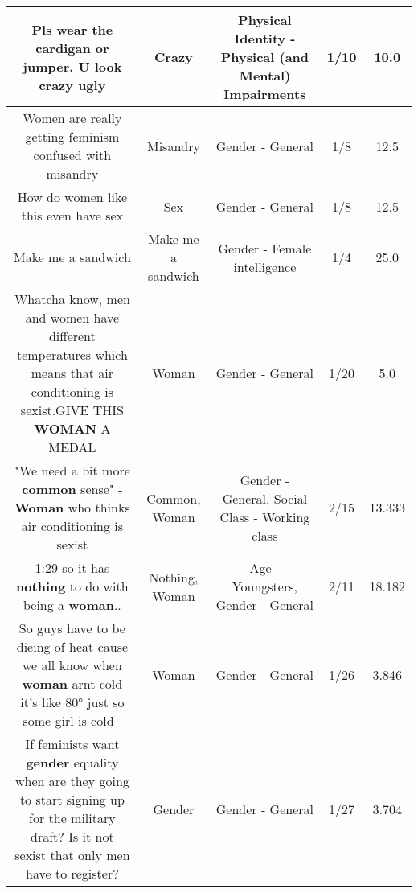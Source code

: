 \documentclass[11pt]{article}
\newlength\mylength
\begin{document}
\begin{center}
\begin{longtable}{|C{.65\mylength}|C{.30\mylength}|C{.12\mylength}|C{.12\mylength}|C{.12\mylength}|}
  \small Pls wear the cardigan or jumper. U look \textbf{crazy} ugly\normalsize   & Crazy & Physical Identity - Physical (and Mental) Impairments & 1/10 & 10.0 \\  \hline
  \small Women are really getting feminism confused with misandry\normalsize   & Misandry & Gender - General & 1/8 & 12.5 \\  \hline
  \small How do women like this even have sex\normalsize   & Sex & Gender - General & 1/8 & 12.5 \\  \hline
  \small Make me a sandwich\normalsize   & Make me a sandwich & Gender - Female intelligence & 1/4 & 25.0 \\  \hline
  \small Whatcha know, men and women have different temperatures which means that air conditioning is sexist.GIVE THIS \textbf{WOMAN} A MEDAL\normalsize   & Woman & Gender - General & 1/20 & 5.0 \\  \hline
  \small "We need a bit more \textbf{common} sense" - \textbf{Woman} who thinks air conditioning is sexist\normalsize   & Common, Woman & Gender - General, Social Class - Working class & 2/15 & 13.333 \\  \hline
  \small 1:29 so it has \textbf{nothing} to do with being a \textbf{woman}..\normalsize   & Nothing, Woman & Age - Youngsters, Gender - General & 2/11 & 18.182 \\  \hline
  \small So guys have to be dieing of heat cause we all know when \textbf{woman} arnt cold it's like 80° just so some girl is cold 🤔\normalsize   & Woman & Gender - General & 1/26 & 3.846 \\  \hline
  \small If feminists want \textbf{gender} equality when are they going to start signing up for the military draft? Is it not sexist that only men have to register?\normalsize   & Gender & Gender - General & 1/27 & 3.704 \\  \hline

\end{longtable}
\end{center}
\end{document}
